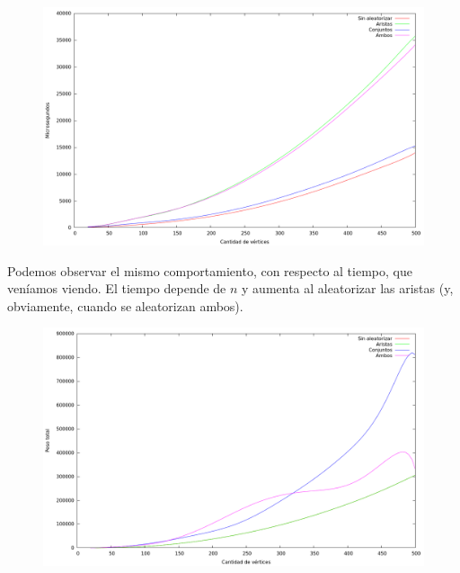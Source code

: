\begin{figure}[H]
  \begin{center}
    \includegraphics[scale=0.35]{imagenes/grasp-goloso-n-tiempo.png}
  \end{center}
\end{figure}

Podemos observar el mismo comportamiento, con respecto al tiempo, que veníamos
viendo. El tiempo depende de $n$ y aumenta al aleatorizar las aristas (y,
obviamente, cuando se aleatorizan ambos).

\begin{figure}[H]
  \begin{center}
    \includegraphics[scale=0.35]{imagenes/grasp-goloso-n-peso.png}
  \end{center}
\end{figure}

